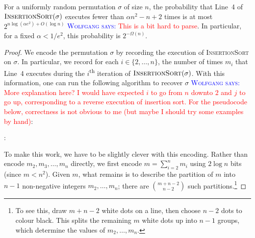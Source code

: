 \documentclass{patmorin}
\newcommand{\aremark}[3]{\textcolor{blue}{\textsc{#1 #2:}}
  \textcolor{red}{\textsf{#3}}}
\newcommand{\wolfgang}[2][says]{\aremark{Wolfgang}{#1}{#2}}
\begin{document}
\begin{thm}
  For a uniformly random permutation $\sigma$ of size $n$, the
  probability that Line~4 of $\textsc{InsertionSort}(\sigma)$ executes
  fewer than $\alpha n^2 - n + 2$ times is at most $2^{n\log(\alpha
    e^2)+O(\log n)}$ \wolfgang{This is a bit hard to parse}.  
    In particular, for a fixed $\alpha < 1/e^2$,
  this probability is $2^{-\Omega(n)}$.
\end{thm}

\begin{proof}
  We encode the permutation $\sigma$ by recording the execution of
  \textsc{InsertionSort} on $\sigma$. In particular, we record
  for each $i\in\{2,\ldots,n\}$, the number of times $m_i$ that Line~4
  executes during the $i$\textsuperscript{th} iteration of
  $\textsc{InsertionSort}(\sigma)$. With this information, one can run
  the following algorithm to recover $\sigma$
  \wolfgang{More explanation here? I would have expected
  $i$ to go from $n$ downto $2$ and $j$ to go up, corresponding
  to a reverse execution of insertion sort. For the
  pseudocode below, correctness is not obvious to me (but
  maybe I should try some examples by hand)}:
  
  :
  \begin{algorithmic}[1]
       \ENDFOR
    \ENDFOR
    \RETURN{$\sigma$}
  \end{algorithmic}
   
  To make this work, we have to be slightly clever with this
  encoding. Rather than encode $m_2,m_3,\ldots,m_n$ directly, we first
  encode $m=\sum_{i=2}^{n} m_i$ using $2\log n$ bits (since
  $m < n^2$). Given $m$, what remains is to describe the partition of
  $m$ into $n-1$ non-negative integers $m_2,\ldots,m_n$; there are
  $\binom{m+n-2}{n-2}$ such partitions.\footnote{To see this, draw
    $m+n-2$ white dots on a line, then choose $n-2$ dots to colour
    black. This splits the remaining $m$ white dots up into $n-1$
    groups, which determine the values of $m_2,\ldots,m_n$.}
  

\end{proof}
\end{document}
